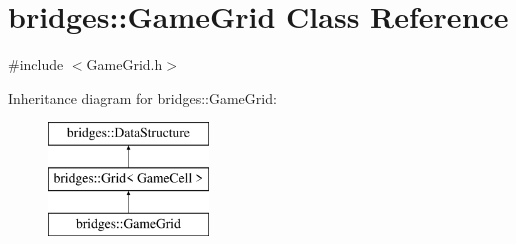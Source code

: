 \hypertarget{classbridges_1_1_game_grid}{}\section{bridges\+::Game\+Grid Class Reference}
\label{classbridges_1_1_game_grid}


{\ttfamily \#include $<$Game\+Grid.\+h$>$}

Inheritance diagram for bridges\+::Game\+Grid\+:\begin{figure}[H]
\begin{center}
\leavevmode
\includegraphics[height=3.000000cm]{classbridges_1_1_game_grid}
\end{center}
\end{figure}
